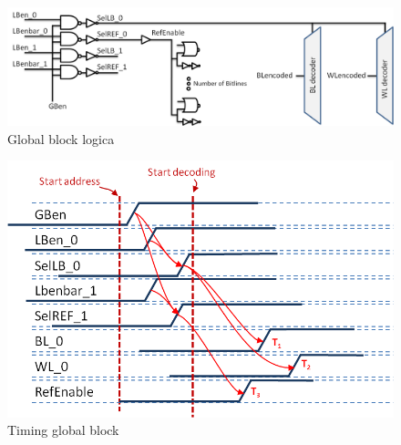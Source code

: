 \begin{figure}[!ht]
  \centering
  \includegraphics[scale=0.6]{../fig/hfdstk-timing-gb1.png}
  \caption[Global block:logica]{Global block logica}
  \label{fig:gb_timing1}
\end{figure}

\begin{figure}[!ht]
  \centering
  \includegraphics[scale=0.9]{../fig/hfdstk-timing-gb2.png}
  \caption[Global block:timing]{Timing global block}
  \label{fig:gb_timing2}
\end{figure}

